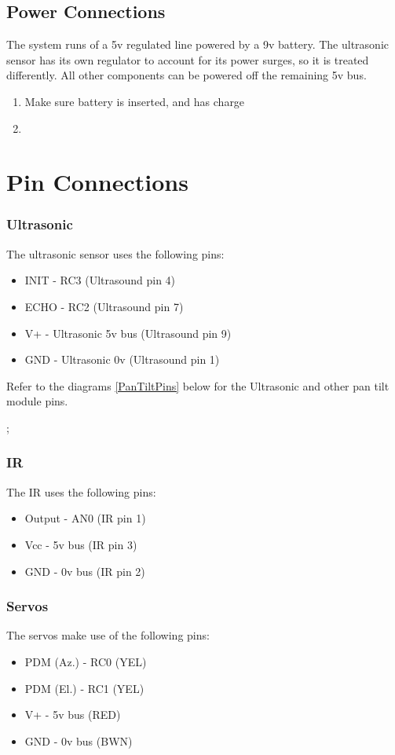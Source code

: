\documentclass[]{report}
\begin{document}
\section{Power Connections}
The system runs of a 5v regulated line powered by a 9v battery. The ultrasonic sensor has its own regulator to account for its power surges, so it is treated differently. All other components can be powered off the remaining 5v bus.

\begin{enumerate}
	\item Make sure battery is inserted, and has charge
	\item 
\end{enumerate}

\chapter{Pin Connections}
\subsection{Ultrasonic}
The ultrasonic sensor uses the following pins: 
\begin{itemize}
	\item INIT - RC3 (Ultrasound pin 4)
	\item ECHO - RC2 (Ultrasound pin 7)
	\item V+ - Ultrasonic 5v bus  (Ultrasound pin 9)
	\item GND - Ultrasonic 0v (Ultrasound pin 1)
\end{itemize}
Refer to the diagrams \ref{PanTiltPins} below for the Ultrasonic and other pan tilt module pins.

;
\label{PanTiltPins}

\subsection{IR}
The IR uses the following pins:
\begin{itemize}
	\item Output - AN0 (IR pin 1)
	\item Vcc - 5v bus (IR pin 3)
	\item GND - 0v bus (IR pin 2)
\end{itemize}

\subsection{Servos}
The servos make use of the following pins:
\begin{itemize}
	\item PDM (Az.) - RC0 (YEL)
	\item PDM (El.) - RC1 (YEL)
	\item V+ - 5v bus (RED)
	\item GND - 0v bus (BWN)
\end{itemize}
\end{document}
